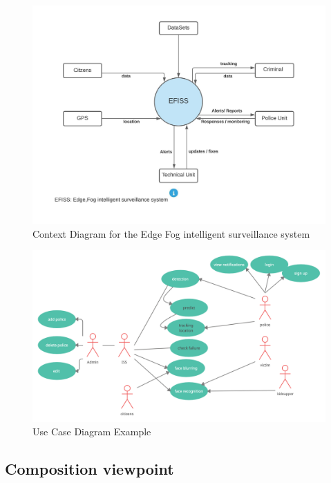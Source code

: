 \documentclass[12pt]{article}
\begin{document}
\begin{figure}[htbp]
\centering
\includegraphics[width=0.8\linewidth]{contextdiagram.jpeg}
\caption{Context Diagram for the Edge Fog intelligent surveillance system}
\label{fig:ctx}
\end{figure}
\FloatBarrier

\begin{figure}[htbp]
\centering
\includegraphics[width=0.9\linewidth]{survillienceusecase.png}
\caption{Use Case Diagram Example}
\label{fig:ucase}
\end{figure}
\FloatBarrier
\subsection{Composition viewpoint}\label{ss-comp}
\end{document}
